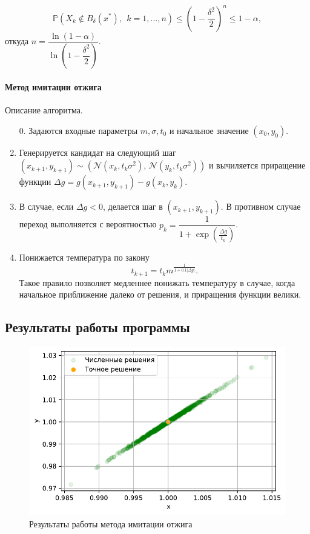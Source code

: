 \documentclass[16pt]{article}
\begin{document}
$$\mathbb{P}(X_k \notin B_\delta(x^*), \ \ k = 1, \ldots, n) \leq \left(1 - \dfrac{\delta^2}{2}\right)^n \leq 1 - \alpha,$$
откуда $n = \dfrac{\ln(1 - \alpha)}{\ln\left(1 - \dfrac{\delta^2}{2}\right)}$.
\paragraph{Метод имитации отжига}
Описание алгоритма.
\begin{enumerate}
	\item[0.] Задаются входные параметры $m, \sigma, t_0$ и начальное значение $(x_0, y_0)$.
	\item Генерируется кандидат на следующий шаг $(x_{k+1}, y_{k+1}) \sim (\mathcal{N}(x_k, t_k\sigma^2),\, \mathcal{N}(y_k, t_k\sigma^2))$ и вычиляется приращение функции $\Delta g = g(x_{k+1}, y_{k+1}) - g(x_k, y_k)$.
	\item В случае, если $\Delta g < 0$, делается шаг в $(x_{k+1}, y_{k+1})$.
В противном случае переход выполняется с вероятностью 
$p_k = \dfrac{1}{1 + \exp\left(\frac{\Delta g}{t_k}\right)}$.
	\item Понижается температура по закону
$$t_{k+1} = t_k m^{\frac{1}{1+0.1|\Delta g|}}.$$
Такое правило позволяет медленнее понижать температуру в случае, когда начальное приближение далеко от решения, и приращения функции велики.
\end{enumerate}

\subsection{Результаты работы программы}
\begin{figure}[h]
	\center
	\includegraphics[scale=0.7]{7_1.pdf}
	\caption{Результаты работы метода имитации отжига}
\end{figure}
\end{document}
